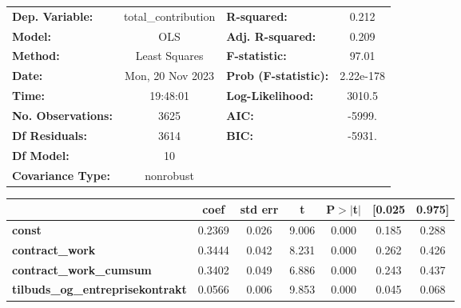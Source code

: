 \begin{center}
\begin{tabular}{lclc}
\toprule
\textbf{Dep. Variable:}                  & total\_contribution & \textbf{  R-squared:         } &     0.212   \\
\textbf{Model:}                          &         OLS         & \textbf{  Adj. R-squared:    } &     0.209   \\
\textbf{Method:}                         &    Least Squares    & \textbf{  F-statistic:       } &     97.01   \\
\textbf{Date:}                           &   Mon, 20 Nov 2023  & \textbf{  Prob (F-statistic):} & 2.22e-178   \\
\textbf{Time:}                           &       19:48:01      & \textbf{  Log-Likelihood:    } &    3010.5   \\
\textbf{No. Observations:}               &          3625       & \textbf{  AIC:               } &    -5999.   \\
\textbf{Df Residuals:}                   &          3614       & \textbf{  BIC:               } &    -5931.   \\
\textbf{Df Model:}                       &            10       & \textbf{                     } &             \\
\textbf{Covariance Type:}                &      nonrobust      & \textbf{                     } &             \\
\bottomrule
\end{tabular}
\begin{tabular}{lcccccc}
                                         & \textbf{coef} & \textbf{std err} & \textbf{t} & \textbf{P$> |$t$|$} & \textbf{[0.025} & \textbf{0.975]}  \\
\midrule
\textbf{const}                           &       0.2369  &        0.026     &     9.006  &         0.000        &        0.185    &        0.288     \\
\textbf{contract\_work}                  &       0.3444  &        0.042     &     8.231  &         0.000        &        0.262    &        0.426     \\
\textbf{contract\_work\_cumsum}          &       0.3402  &        0.049     &     6.886  &         0.000        &        0.243    &        0.437     \\
\textbf{tilbuds\_og\_entreprisekontrakt} &       0.0566  &        0.006     &     9.853  &         0.000        &        0.045    &        0.068     \\

\end{tabular}
\end{center}
